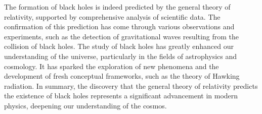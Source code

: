 \documentclass{article}
\begin{document}
\large 

The formation of black holes is indeed predicted by the general theory of relativity, supported by comprehensive analysis of scientific data. The confirmation of this prediction has come through various observations and experiments, such as the detection of gravitational waves resulting from the collision of black holes. 
The study of black holes has greatly enhanced our understanding of the universe, particularly in the fields of astrophysics and cosmology. It has sparked the exploration of new phenomena and the development of fresh conceptual frameworks, such as the theory of Hawking radiation. In summary, the discovery that the general theory of relativity predicts the existence of black holes represents a significant advancement in modern physics, deepening our understanding of the cosmos. 
\end{document}
